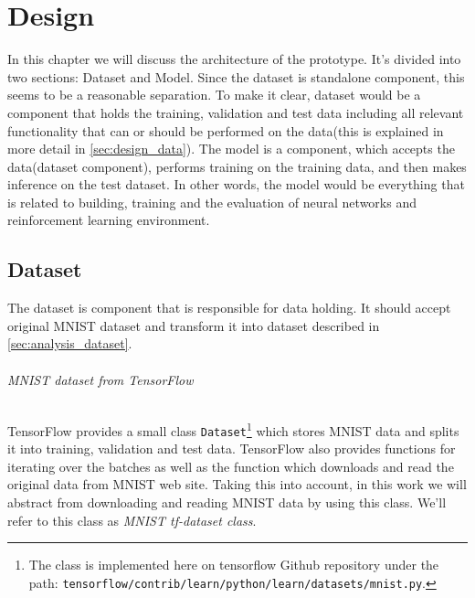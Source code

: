 \chapter{Design}
\label{ch:design}
In this chapter we will discuss the architecture of the prototype.
It's divided into two sections: Dataset and Model. Since
the dataset is standalone component, this seems to be
a reasonable separation. To make it clear, dataset would be a component
that holds the training, validation and test data including all relevant
functionality that can or should be performed on the
data(this is explained in more detail in \autoref{sec:design_data}).
The model is a component, which accepts the data(dataset component), performs
training on the training data, and then makes inference on the test dataset.
In other words, the model would be everything that is related to building,
training and the evaluation of neural networks and reinforcement learning environment.



\section{Dataset}
\label{sec:design_data}

The dataset is component that is responsible for data holding. It should
accept original MNIST dataset and transform it into dataset described
in \autoref{sec:analysis_dataset}.


\subparagraph{MNIST dataset from TensorFlow}

TensorFlow provides a small class \lstinline{Dataset}\footnote{
The class is implemented here on tensorflow Github repository under the path: \lstinline{tensorflow/contrib/learn/python/learn/datasets/mnist.py}.
} which stores MNIST data and splits it into training,
validation and test data. TensorFlow also provides functions for iterating
over the batches as well as the function which downloads and read
the original data
from MNIST web site. Taking this into account, in this work we will abstract from
downloading and reading MNIST data by using this class. We'll refer
to this class as \emph{MNIST tf-dataset class}.


